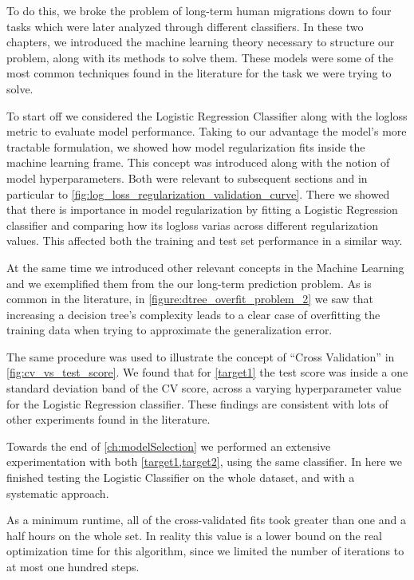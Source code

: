 To do this, we broke the problem of long-term human migrations down to four tasks which were later analyzed through different classifiers.
In these two chapters, we introduced the machine learning theory necessary to structure our problem, along with its methods to solve them.
These models were some of the most common techniques found in the literature for the task we were trying to solve.

To start off we considered the Logistic Regression Classifier along with the logloss metric to evaluate model performance.
Taking to our advantage the model's more tractable formulation, we showed how model regularization fits inside the machine learning frame.
This concept was introduced along with the notion of model hyperparameters. 
Both were relevant to subsequent sections and in particular to \cref{fig:log_loss_regularization_validation_curve}.
There we showed that there is importance in model regularization by fitting a Logistic Regression classifier and comparing how its logloss varias across different regularization values. 
This affected both the training and test set performance in a similar way.


At the same time we introduced other relevant concepts in the Machine Learning and we exemplified them from the our long-term prediction problem. 
As is common in the literature, in \cref{figure:dtree_overfit_problem_2} we saw that increasing a decision tree's complexity leads to a clear case of overfitting the training data when trying to approximate the generalization error.

The same procedure was used to illustrate the concept of ``Cross Validation'' in \cref{fig:cv_vs_test_score}. 
We found that for \cref{target1} the test score was inside a one standard deviation band of the CV score, across a varying hyperparameter value for the Logistic Regression classifier. 
These findings are consistent with lots of other experiments found in the literature. 


Towards the end of \cref{ch:modelSelection} we performed an extensive experimentation with both \cref{target1,target2}, using the same classifier.
In here we finished testing the Logistic Classifier on the whole dataset, and with a systematic approach.

As a minimum runtime, all of the cross-validated fits took greater than one and a half hours on the whole set.
In reality this value is a lower bound on the real optimization time for this algorithm, since we limited the number of iterations to at most one hundred steps.

